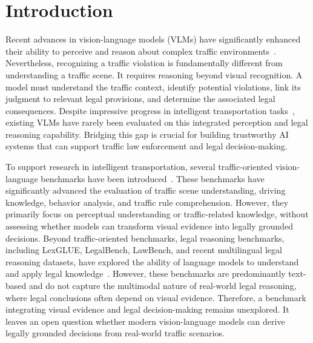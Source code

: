 \section{Introduction}
Recent advances in vision-language models (VLMs)  have significantly enhanced their ability to perceive and reason about complex traffic environments~\cite{zhou2024vision}. Nevertheless, recognizing a traffic violation is fundamentally different from understanding a traffic scene. It requires reasoning beyond visual recognition. A model must understand the traffic context, identify potential violations, link its judgment to relevant legal provisions, and determine the associated legal consequences. Despite impressive progress in intelligent transportation tasks~\cite{li2023blip,liu2024improved,wang2024qwen2,chen2023internvl,wu2025trafficinternvl,kuang2025traffic}, existing VLMs have rarely been evaluated on this integrated perception and legal reasoning capability. Bridging this gap is crucial for building trustworthy AI systems that can support traffic law enforcement and legal decision-making.

To support research in intelligent transportation, several traffic-oriented vision-language benchmarks have been introduced~\cite{qian2024nuscenesqa,wei2025driveqa,guan2026roadscenevqa,luu2025vlsp}. These benchmarks have significantly advanced the evaluation of traffic scene understanding, driving knowledge, behavior analysis, and traffic rule comprehension. However, they primarily focus on perceptual understanding or traffic-related knowledge, without assessing whether models can transform visual evidence into legally grounded decisions. Beyond traffic-oriented benchmarks, legal reasoning benchmarks, including LexGLUE, LegalBench, LawBench, and recent multilingual legal reasoning datasets, have explored the ability of language models to understand and apply legal knowledge~\cite{chalkidis2022lexglue,guha2023legalbench,fei2024lawbench,yu2027benchmarking}. However, these benchmarks are predominantly text-based and do not capture the multimodal nature of real-world legal reasoning, where legal conclusions often depend on visual evidence. Therefore, a benchmark integrating visual evidence and legal decision-making remains unexplored. It leaves an open question whether modern vision-language models can derive legally grounded decisions from real-world traffic scenarios.


